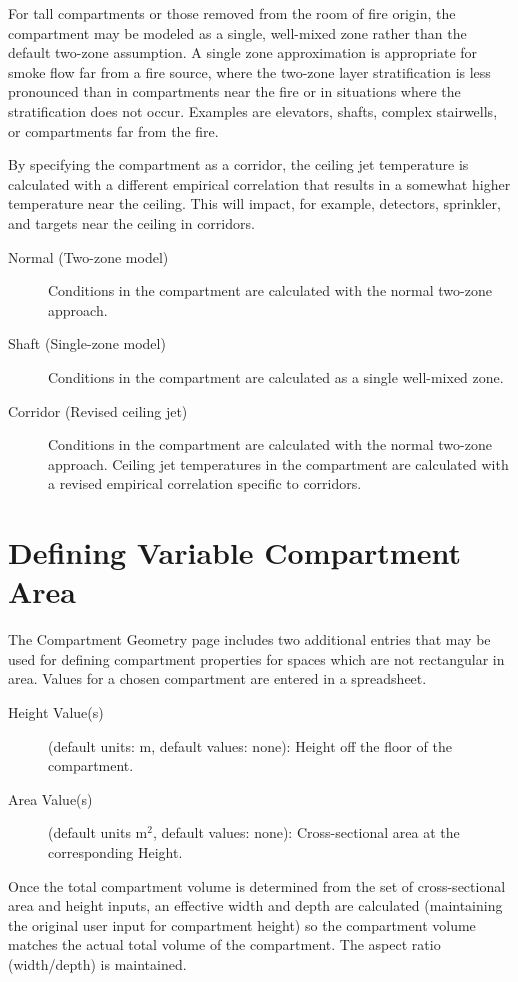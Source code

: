 For tall compartments or those removed from the room of fire origin, the compartment may be modeled as a single, well-mixed zone rather than the default two-zone assumption. A single zone approximation is appropriate for smoke flow far from a fire source, where the two-zone layer stratification is less pronounced than in compartments near the fire or in situations where the stratification does not occur. Examples are elevators, shafts, complex stairwells, or compartments far from the fire.

By specifying the compartment as a corridor, the ceiling jet temperature is calculated with a different empirical correlation that results in a somewhat higher temperature near the ceiling.  This will impact, for example, detectors, sprinkler, and targets near the ceiling in corridors.

\begin{description}
\item[Normal (Two-zone model)] Conditions in the compartment are calculated with the normal two-zone approach.

\item[Shaft (Single-zone model)] Conditions in the compartment are calculated as a single well-mixed zone.

\item[Corridor (Revised ceiling jet)] Conditions in the compartment are calculated with the normal two-zone approach. Ceiling jet temperatures in the compartment are calculated with a revised empirical correlation specific to corridors.
\end{description}


\section{Defining Variable Compartment Area}

The Compartment Geometry page includes two additional entries that may be used for defining compartment properties for spaces which are not rectangular in area.  Values for a chosen compartment are entered in a spreadsheet.
\begin{description}
\item[Height Value(s)] (default units: m, default values: none): Height off the floor of the compartment.
\item[Area Value(s)] (default units m$^2$, default values: none): Cross-sectional area at the corresponding Height.
\end{description}
Once the total compartment volume is determined from the set of cross-sectional area and height inputs, an effective width and depth are calculated (maintaining the original user input for compartment height) so the compartment volume matches the actual total volume of the compartment. The aspect ratio (width/depth) is maintained.

